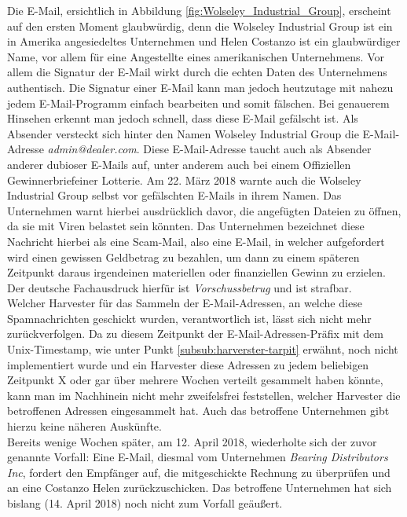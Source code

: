 Die E-Mail, ersichtlich in Abbildung \ref{fig:Wolseley_Industrial_Group}, erscheint auf den ersten Moment glaubwürdig, denn die Wolseley Industrial Group ist ein in Amerika angesiedeltes Unternehmen und Helen Costanzo ist ein glaubwürdiger Name, vor allem für eine Angestellte eines amerikanischen Unternehmens. Vor allem die Signatur der E-Mail wirkt durch die echten Daten des Unternehmens authentisch. Die Signatur einer E-Mail kann man jedoch heutzutage mit nahezu jedem E-Mail-Programm einfach bearbeiten und somit fälschen. Bei genauerem Hinsehen erkennt man jedoch schnell, dass diese E-Mail gefälscht ist. Als Absender versteckt sich hinter den Namen Wolseley Industrial Group die E-Mail-Adresse \emph{admin@dealer.com}. Diese E-Mail-Adresse taucht auch als Absender anderer dubioser E-Mails auf, unter anderem auch bei einem \glqq Offiziellen Gewinnerbrief\grqq\space einer Lotterie\cite{gewinnerbrief-admin-dealer}. Am 22. März 2018 warnte auch die Wolseley Industrial Group selbst vor gefälschten E-Mails in ihrem Namen\cite{scam-warnung-wolseley}. Das Unternehmen warnt hierbei ausdrücklich davor, die angefügten Dateien zu öffnen, da sie mit Viren belastet sein könnten. Das Unternehmen bezeichnet diese Nachricht hierbei als eine Scam-Mail, also eine E-Mail, in welcher aufgefordert wird einen gewissen Geldbetrag zu bezahlen, um dann zu einem späteren Zeitpunkt daraus irgendeinen materiellen oder finanziellen Gewinn zu erzielen. Der deutsche Fachausdruck hierfür ist \emph{Vorschussbetrug} und ist strafbar\cite{vorschussbetrug}.\\
Welcher Harvester für das Sammeln der E-Mail-Adressen, an welche diese Spamnachrichten geschickt wurden, verantwortlich ist, lässt sich nicht mehr zurückverfolgen. Da zu diesem Zeitpunkt der E-Mail-Adressen-Präfix mit dem Unix-Timestamp, wie unter Punkt \ref{subsub:harverster-tarpit} erwähnt, noch nicht implementiert wurde und ein Harvester diese Adressen zu jedem beliebigen Zeitpunkt X oder gar über mehrere Wochen verteilt gesammelt haben könnte, kann man im Nachhinein nicht mehr zweifelsfrei feststellen, welcher Harvester die betroffenen Adressen eingesammelt hat. Auch das betroffene Unternehmen gibt hierzu keine näheren Auskünfte.
\\Bereits wenige Wochen später, am 12. April 2018, wiederholte sich der zuvor genannte Vorfall: Eine E-Mail, diesmal vom Unternehmen \emph{Bearing Distributors Inc}, fordert den Empfänger auf, die mitgeschickte Rechnung zu überprüfen und an eine Costanzo Helen zurückzuschicken. Das betroffene Unternehmen hat sich bislang (14. April 2018) noch nicht zum Vorfall geäußert.

